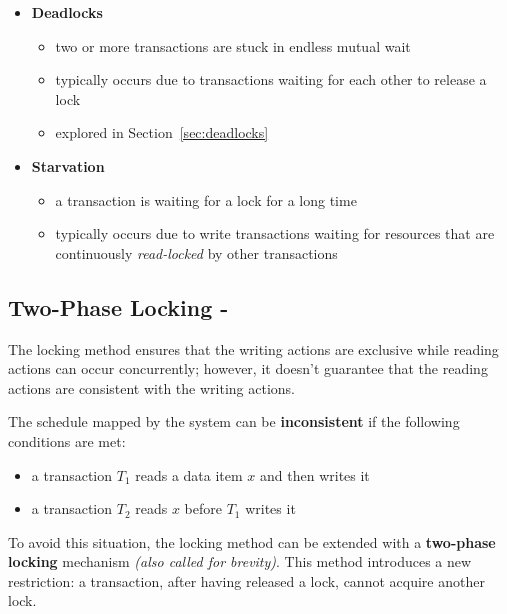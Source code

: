 \documentclass[english]{article}
\begin{document}
\begin{itemize}
  \item \textbf{Deadlocks}
        \begin{itemize}
          \item two or more transactions are stuck in endless mutual wait
          \item typically occurs due to transactions waiting for each other to release a lock
          \item explored in Section~\ref{sec:deadlocks}
        \end{itemize}
  \item \textbf{Starvation}
        \begin{itemize}
          \item a transaction is waiting for a lock for a long time
          \item typically occurs due to write transactions waiting for resources that are continuously \textit{read-locked} by other transactions
        \end{itemize}
\end{itemize}

\subsection{Two-Phase Locking - \TPL}

The locking method ensures that the writing actions are exclusive while reading actions can occur concurrently;
however, it doesn't guarantee that the reading actions are consistent with the writing actions.

The schedule mapped by the \CC system can be \textbf{inconsistent} if the following conditions are met:

\begin{itemize}
  \item a transaction \(T_1\) reads a data item \(x\) and then writes it
  \item a transaction \(T_2\) reads \(x\) before \(T_1\) writes it
\end{itemize}

To avoid this situation, the locking method can be extended with a \textbf{two-phase locking} mechanism \textit{(also called
  \TPL for brevity)}.
This method introduces a new restriction: a transaction, after having released a lock, cannot acquire another lock.
\end{document}
